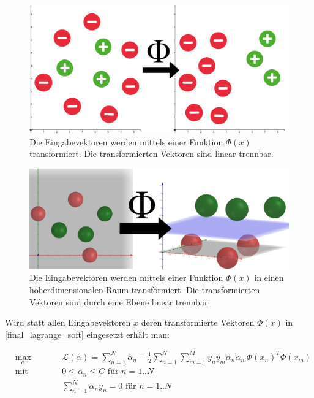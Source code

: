 \documentclass[a4paper,11pt,twoside]{scrreprt}
\newcommand{\Lagr}{\mathcal{L}}
\begin{document}
\begin{figure}[H]
	\centering
	\includegraphics[width = 13cm]{assets/transformation.png}
	\caption{Die Eingabevektoren werden mittels einer Funktion $\Phi(x)$ transformiert. Die transformierten Vektoren sind linear trennbar.}
	\label{fig:phi_transformation1}
\end{figure}

\begin{figure}[H]
	\centering
	\includegraphics[width = 13cm]{assets/2d_to_3d_phi.png}
	\caption{Die Eingabevektoren werden mittels einer Funktion $\Phi(x)$ in einen höherdimensionalen Raum transformiert. Die transformierten Vektoren sind durch eine Ebene linear trennbar.}
	\label{fig:phi_transformation2}
\end{figure}



Wird statt allen Eingabevektoren $x$ deren transformierte Vektoren $\Phi(x)$ in \autoref{final_lagrange_soft} eingesetzt erhält man: 

\begin{subequations} \label{eq:soft_margin_with_transform}
	\begin{alignat}{2}
		&\!\max_{\alpha}        &\qquad&  	\Lagr(\alpha) = \sum_{n=1}^{N} \alpha_{n} - \frac{1}{2} \sum_{n=1}^{N} \sum_{m=1}^{M} y_{n} y_{m} \alpha_{n} \alpha_{m} \Phi(x_{n})^{T} \Phi(x_{m})\\
		&\text{mit } &      & 0 \leq \alpha_{n} \leq C \text{ für } n=1..N\\
		&       & & \sum_{n=1}^{N} \alpha_{n} y_{n} = 0\text{ für } n=1..N
	\end{alignat}
\end{subequations}
\end{document}
